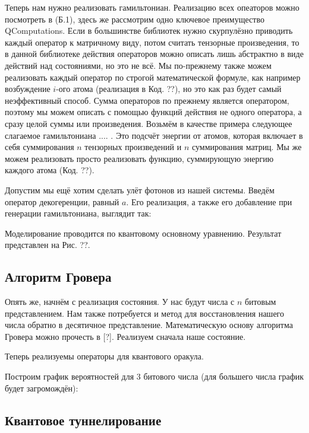 \documentclass[aps,twocolumn,pra,showpacs,amsmath,amssymb,showkeys,10pt]{revtex4-2}
\begin{document}
    Теперь нам нужно реализовать гамильтониан. Реализацию всех опеаторов можно посмотреть в (Б.1), здесь же рассмотрим одно ключевое преимущество QComputations. Если в большинстве библиотек нужно 
    скурпулёзно приводить каждый оператор к матричному виду, потом считать тензорные произведения, то в данной библиотеке действия операторов можно описать лишь абстрактно в виде действий над состояниями,
    но это не всё. Мы по-прежнему также можем реализовать каждый оператор по строгой математической формуле, как например возбуждение $i$-ого атома (реализация в Код. ??), но это как раз будет 
    самый неэффективный способ. Сумма операторов по прежнему является оператором, поэтому мы можем описать с помощью функций действия не одного оператора, а сразу целой суммы или произведения.
    Возьмём в качестве примера следующее слагаемое гамильтониана ....  . Это подсчёт энергии от атомов, которая включает в себя суммирования $n$ тензорных произведений и $n$ суммирования матриц. Мы же 
    можем реализовать просто реализовать функцию, суммирующую энергию каждого атома (Код. ??).

    Допустим мы ещё хотим сделать улёт фотонов из нашей системы. Введём оператор декогеренции, равный $a$. Его реализация, а также его добавление при генерации гамильтониана, выглядит так:




    Моделирование проводится по квантовому основному уравнению. Результат представлен на Рис. ??. 



    \subsection{Алгоритм Гровера}

    Опять же, начнём с реализация состояния. У нас будут числа с $n$ битовым представлением. Нам также потребуется и метод для восстановления нашего числа обратно в десятичное представление. 
    Математическую основу алгоритма Гровера можно прочесть в [?]. Реализуем сначала наше состояние.


    Теперь реализуемы операторы для квантового оракула.


    Построим график вероятностей для 3 битового числа (для большего числа график будет загромождён):

    \subsection{Квантовое туннелирование}
\end{document}
